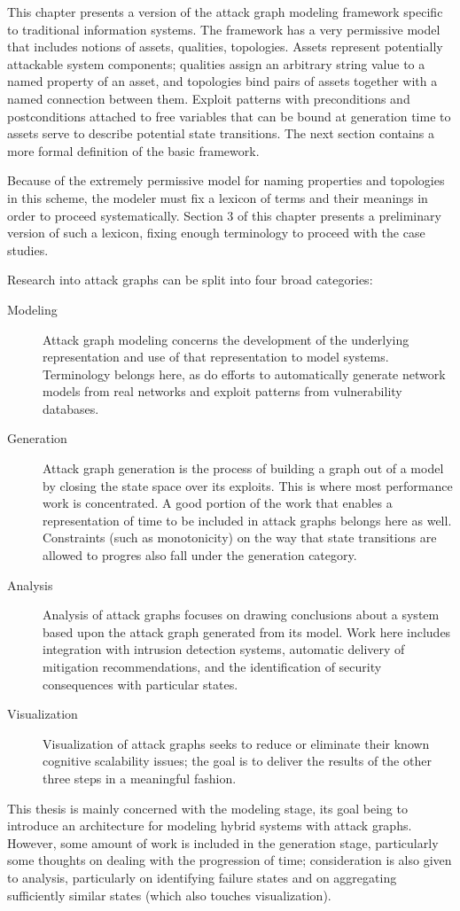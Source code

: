 This chapter presents a version of the attack graph modeling framework specific
to traditional information systems. The framework has a very permissive model that
includes notions of assets, qualities, topologies. Assets represent potentially
attackable system components; qualities assign an arbitrary string value to a named
property of an asset, and topologies bind pairs of assets together with a named
connection between them. Exploit patterns with preconditions and postconditions attached
to free variables that can be bound at generation time to assets serve to describe potential
state transitions. The next section contains a more formal definition of the basic
framework.

Because of the extremely permissive model for naming properties and topologies in this
scheme, the modeler must fix a lexicon of terms and their meanings in order to proceed
systematically. Section 3 of this chapter presents a preliminary version of such a lexicon,
fixing enough terminology to proceed with the case studies.

Research into attack graphs can be split into four broad categories:
\begin{description}
\item[Modeling] Attack graph modeling concerns the development of the underlying representation
	and use of that representation to model systems. Terminology belongs here, as do efforts to
	automatically generate network models from real networks and exploit patterns from vulnerability
	databases.
\item[Generation] Attack graph generation is the process of building a graph out of a model by
	closing the state space over its exploits. This is where most performance work is concentrated.
	A good portion of the work that enables a representation of time to be included in attack graphs
	belongs here as well. Constraints (such as monotonicity) on the way that state transitions are 
	allowed to progres also fall under the generation category.
\item[Analysis] Analysis of attack graphs focuses on drawing conclusions about a system based upon
	the attack graph generated from its model. Work here includes integration with intrusion detection
	systems, automatic delivery of mitigation recommendations, and the identification of security
	consequences with particular states.
\item[Visualization] Visualization of attack graphs seeks to reduce or eliminate their
	known cognitive scalability issues; the goal is to deliver the results of the other three
	steps in a meaningful fashion.
\end{description}
This thesis is mainly concerned with the modeling stage, its goal being to introduce an
architecture for modeling hybrid systems with attack graphs. However, some amount of work is
included in the generation stage, particularly some thoughts on dealing with the progression
of time; consideration is also given to analysis, particularly on identifying failure states and
on aggregating sufficiently similar states (which also touches visualization).

